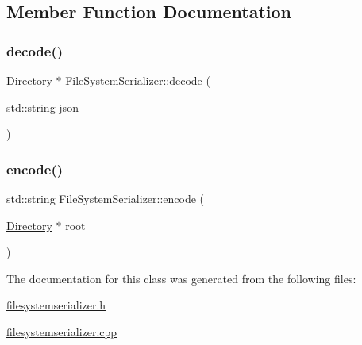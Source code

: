 \subsection{Member Function Documentation}
\mbox{\label{class_file_system_serializer_a9a32306fcb9133696c1b5f795eaa1933}} 
\subsubsection{\texorpdfstring{decode()}{decode()}}
{\footnotesize\ttfamily \hyperlink{class_directory}{Directory} $\ast$ File\+System\+Serializer\+::decode (\begin{DoxyParamCaption}\item[{std\+::string}]{json }\end{DoxyParamCaption})\hspace{0.3cm}{\ttfamily [static]}}

\mbox{\label{class_file_system_serializer_aef096d9b5936bddd4beac3dc9181c28f}} 
\subsubsection{\texorpdfstring{encode()}{encode()}}
{\footnotesize\ttfamily std\+::string File\+System\+Serializer\+::encode (\begin{DoxyParamCaption}\item[{\hyperlink{class_directory}{Directory} $\ast$}]{root }\end{DoxyParamCaption})\hspace{0.3cm}{\ttfamily [static]}}



The documentation for this class was generated from the following files\+:\begin{DoxyCompactItemize}
\item 
\hyperlink{filesystemserializer_8h}{filesystemserializer.\+h}\item 
\hyperlink{filesystemserializer_8cpp}{filesystemserializer.\+cpp}\end{DoxyCompactItemize}
